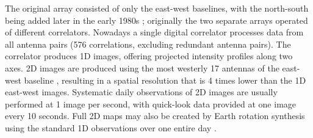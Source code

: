 {\color{blue}The original array consisted of only the east-west baselines, with the north-south being added later in the early 1980s \citep{bonmartin1983}; originally the two separate arrays operated of different correlators. Nowadays a single digital correlator processes data from all antenna pairs (576 correlations, excluding redundant antenna pairs). The correlator produces 1D images, offering projected intensity profiles along two axes. 2D images are produced using the most westerly 17 antennas of the east-west baseline \citep{kerdraon1997}, resulting in a spatial resolution that is 4 times lower than the 1D east-west images. Systematic daily observations of 2D images are usually performed at 1 image per second, with quick-look data provided at one image every 10 seconds. Full 2D maps may also be created by Earth rotation synthesis using the standard 1D observations over one entire day \citep{nrh1993, mercier2009, mercier2012}.}




